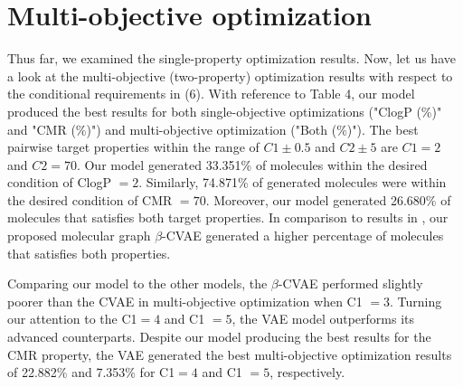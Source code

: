 \section{Multi-objective optimization}
Thus far, we examined the single-property optimization results. Now, let us have a look at the multi-objective (two-property) optimization results with respect to the conditional requirements in (6). With reference to Table 4, our model produced the best results for both single-objective optimizations ("ClogP (\%)" and "CMR (\%)") and multi-objective optimization ("Both (\%)"). The best pairwise target properties within the range of $C1 \pm 0.5$ and $C2 \pm 5$ are $C1 = 2$ and  $C2 = 70$. Our model generated 33.351\% of molecules within the desired condition of ClogP $= 2$. Similarly, 74.871\% of generated molecules were within the desired condition of CMR $= 70$. Moreover, our model generated 26.680\% of molecules that satisfies both target properties. In comparison to results in \cite{lee2022mgcvae}, our proposed molecular graph $\beta$-CVAE generated a higher percentage of molecules that satisfies both properties. 

Comparing our model to the other models, the $\beta$-CVAE performed slightly poorer than the CVAE in multi-objective optimization when C1 $= 3$. Turning our attention to the C1$ = 4$ and C1 $= 5$, the VAE model outperforms its advanced counterparts. Despite our model producing the best results for the CMR property, the VAE generated the best multi-objective optimization results of 22.882\% and 7.353\% for C1$ = 4$ and C1 $= 5$, respectively.

